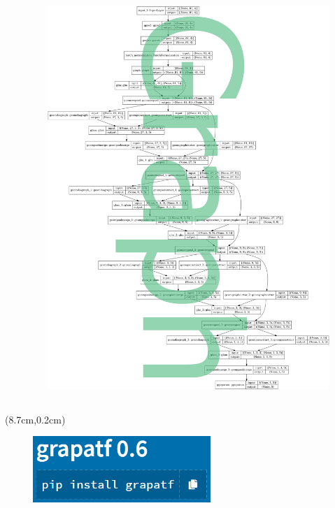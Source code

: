 \documentclass[hyperref={pdfpagelabels=false}]{beamer}
\begin{document}
\begin{frame}[label=]
\begin{columns}[c]
\begin{column}{0.48\textwidth}
\end{column}%
\hfill%
\begin{column}{0.48\textwidth}%
\begin{figure}[H] 
  \centering
\includegraphics[height=0.9\textheight]{../imgs/xgraphencode.png}
\label{fig:xgraphencodepng}
  \end{figure}


\end{column}%
\hfill%
\end{columns}

\begin{textblock*}{5cm}(8.7cm,0.2cm) %
\begin{figure}[H] 
  \centering
\includegraphics[width=0.6\textwidth]{../imgs/grapa.png}
\label{fig:grapapng}
  \end{figure}


\end{textblock*}

\end{frame}
\end{document}
